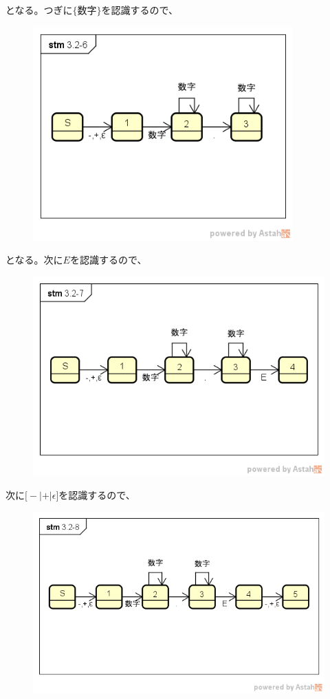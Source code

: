 \documentclass[a4paper,12pt]{jarticle}
\begin{document}
となる。つぎに$ \{ 数字 \} $を認識するので、
\begin{figure}[H]
 \begin{center}
  \includegraphics[width=10cm]{Automatonfig/3-2-6.png}
 \end{center}
\end{figure}
となる。次に$ E $を認識するので、
\begin{figure}[H]
 \begin{center}
  \includegraphics[width=15cm]{Automatonfig/3-2-7.png}
 \end{center}
\end{figure}
次に$ \bigl[ - | + | \epsilon \bigr] $を認識するので、
\begin{figure}[H]
 \begin{center}
  \includegraphics[width=15cm]{Automatonfig/3-2-8.png}
 \end{center}
\end{figure}
\end{document}

